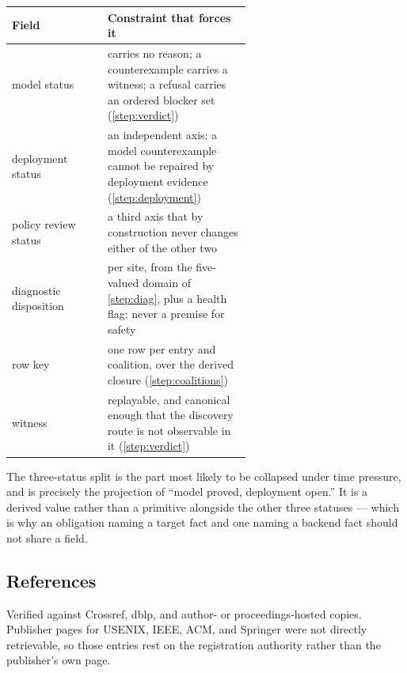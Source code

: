 \begin{center}
\begin{tabular}{@{}l p{0.60\linewidth}@{}}
\toprule
Field & Constraint that forces it \\
\midrule
model status
  & \Proved{} carries no reason; a counterexample carries a witness; a refusal
    carries an ordered blocker set (\cref{step:verdict}) \\[3pt]
deployment status
  & an independent axis: a model counterexample cannot be repaired by deployment
    evidence (\cref{step:deployment}) \\[3pt]
policy review status
  & a third axis that by construction never changes either of the other two \\[3pt]
diagnostic disposition
  & per site, from the five-valued domain of \cref{step:diag}, plus a health
    flag; never a premise for safety \\[3pt]
row key
  & one row per entry and coalition, over the derived closure
    (\cref{step:coalitions}) \\[3pt]
witness
  & replayable, and canonical enough that the discovery route is not
    observable in it (\cref{step:verdict}) \\
\bottomrule
\end{tabular}
\end{center}

The three-status split is the part most likely to be collapsed under time
pressure, and \Conditional{} is precisely the projection of ``model proved,
deployment open.'' It is a derived value rather than a primitive alongside the
other three statuses --- which is why
an obligation naming a target fact and one naming a backend fact should not share
a field.

\subsection{References}
\label{sec:refs}

Verified against Crossref, dblp, and author- or proceedings-hosted copies.
Publisher pages for USENIX, IEEE, ACM, and Springer were not directly
retrievable, so those entries rest on the registration authority rather than the
publisher's own page.

